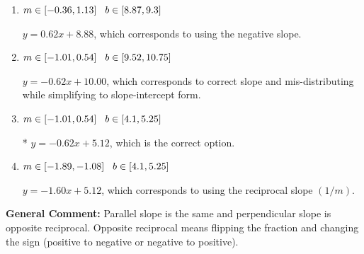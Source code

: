 \documentclass{extbook}[14pt]
\begin{document}
\begin{enumerate}
{\begin{enumerate}[label=\Alph*.]
 $y = -0.62x - 5.12$, which corresponds to using the correct slope and getting the negative $y$-intercept.
\item \( m \in [-0.36, 1.13] \hspace*{3mm} b \in [8.87, 9.3] \)

 $y = 0.62x + 8.88$, which corresponds to using the negative slope.
\item \( m \in [-1.01, 0.54] \hspace*{3mm} b \in [9.52, 10.75] \)

 $y = -0.62x + 10.00$, which corresponds to correct slope and mis-distributing while simplifying to slope-intercept form.
\item \( m \in [-1.01, 0.54] \hspace*{3mm} b \in [4.1, 5.25] \)

* $y = -0.62x + 5.12$, which is the correct option.
\item \( m \in [-1.89, -1.08] \hspace*{3mm} b \in [4.1, 5.25] \)

 $y = -1.60x + 5.12$, which corresponds to using the reciprocal slope $(1/m)$.
\end{enumerate}

\textbf{General Comment:} Parallel slope is the same and perpendicular slope is opposite reciprocal. Opposite reciprocal means flipping the fraction and changing the sign (positive to negative or negative to positive).
}
\end{enumerate}
\end{document}
